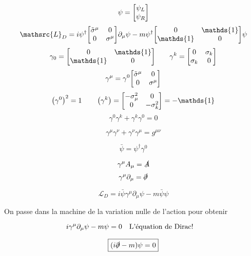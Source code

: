 \begin{tcolorbox}[title=Nouvelle notation: le spineur de dirac]
	$$\psi = \mqty[\psi_{L}\\\psi_R  ]$$  
	$$\mathsrc{L}_D = i\psi^{\dagger}\mqty[\tilde \sigma^{\mu}& 0\\ 0 &\sigma^{\mu}]\partial_{\mu} \psi - m \psi ^{\dagger} \mqty[0 & \mathds{1}\\  \mathds{1} &0 ]\psi$$ 
	$$\gamma_0 = \mqty[0 & \mathds{1} \\ \mathds{1} & 0] \qquad \gamma^{k}= \mqty[0 & \sigma_k \\  \sigma_k &0 ]$$ 
	$$\gamma^{\mu}= \gamma^{0}\mqty[\tilde\sigma^{\mu} & 0 \\ 0 & \sigma^{\mu}]$$ 
	$$\left( \gamma^{0} \right) ^2 = 1 \qquad \left( \gamma^{k} \right) = \mqty[-\sigma_\mu^{2}&0 \\0 & -\sigma_k^{2}]= - \mathds{1}$$ 
	$$\gamma^{0}\gamma^{k}+ \gamma^{k}\gamma^{0}=0$$ 

$$\gamma^{\mu}\gamma^{\nu}+ \gamma^\nu \gamma^{\mu} = g^{\mu\nu}$$ 

$$\boxed{\bar\psi = \psi ^{\dagger}\gamma^{0}}$$ 

\begin{tcolorbox}[title=]
	$$\gamma^{\mu}A_{\mu} = \slashed{A}$$  
	$$\gamma^{\mu}\partial_{\mu} = \slashed{\partial}$$  
\end{tcolorbox}
  
$$\mathscr{L}_D = i \bar \psi \gamma^{\mu}\partial_{\mu} \psi - m \bar \psi \psi$$ 

On passe dans la machine de la variation nulle de l'action pour obtenir

$$i \gamma^{\mu}\partial_{\mu} \psi - m\psi =0\qq{L'équation de Dirac!}$$ 
 
$$\boxed{(i\slashed{\partial} - m)\psi =0}$$ 

\end{tcolorbox}




